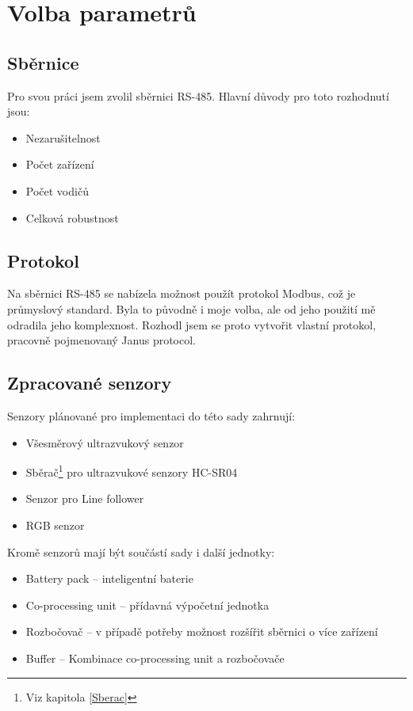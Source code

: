 \chapter{Volba parametrů}
\section{Sběrnice}
Pro svou práci jsem zvolil sběrnici RS-485.
Hlavní důvody pro toto rozhodnutí jsou:
\begin{itemize}
    \item Nezarušitelnost
    \item Počet zařízení
    \item Počet vodičů
    \item Celková robustnost
\end{itemize}

\section{Protokol}
Na sběrnici RS-485 se nabízela možnost použít protokol Modbus, což je průmyslový standard.
Byla to původně i moje volba, ale od jeho použití mě odradila jeho komplexnost.
Rozhodl jsem se proto vytvořit vlastní protokol, pracovně pojmenovaný Janus protocol.

\section{Zpracované senzory}
Senzory plánované pro implementaci do této sady zahrnují:
\begin{itemize}
    \item Všesměrový ultrazvukový senzor
    \item Sběrač\footnote{Viz kapitola \ref{Sberac}} pro ultrazvukové senzory HC-SR04 
    \item Senzor pro Line follower
    \item RGB senzor
    
\end{itemize}
Kromě senzorů mají být součástí sady i další jednotky:
\begin{itemize}
    \item Battery pack -- inteligentní baterie
    \item Co-processing unit -- přídavná výpočetní jednotka
    \item Rozbočovač -- v případě potřeby možnost rozšířit sběrnici o více zařízení
    \item Buffer -- Kombinace co-processing unit a rozbočovače
\end{itemize}
